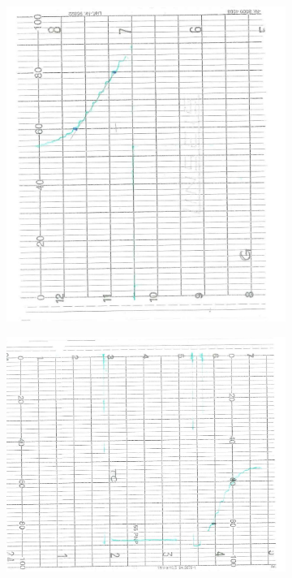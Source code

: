 \documentclass[twocolumn,a4paper,10pt]{my_report}
\begin{document}
{{\begin{figure}[htbp]
\begin{subfigure}{0.5\linewidth}
\centering
\includegraphics[width=0.8\linewidth]{analisi1.jpg}
\label{fig:analisi1}
\end{subfigure}%
\begin{subfigure}{0.5\linewidth}
\centering
\includegraphics[width=0.8\linewidth]{analisi2.jpg}
\label{fig:analisi2}
\end{subfigure}
\begin{subfigure}{0.5\linewidth}
\centering

\end{subfigure}
\end{figure}}}
\end{document}
